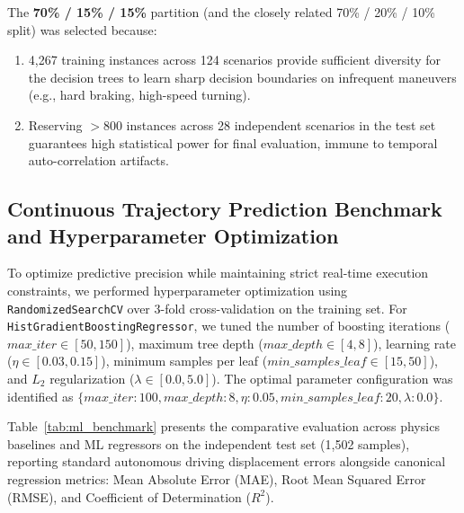 \documentclass[runningheads]{llncs}
\begin{document}
The \textbf{70\% / 15\% / 15\%} partition (and the closely related 70\% / 20\% / 10\% split) was selected because:
\begin{enumerate}
    \item 4,267 training instances across 124 scenarios provide sufficient diversity for the decision trees to learn sharp decision boundaries on infrequent maneuvers (e.g., hard braking, high-speed turning).
    \item Reserving $>800$ instances across 28 independent scenarios in the test set guarantees high statistical power for final evaluation, immune to temporal auto-correlation artifacts.
\end{enumerate}

\subsection{Continuous Trajectory Prediction Benchmark and Hyperparameter Optimization}
To optimize predictive precision while maintaining strict real-time execution constraints, we performed hyperparameter optimization using \texttt{RandomizedSearchCV} over 3-fold cross-validation on the training set. For \texttt{HistGradientBoostingRegressor}, we tuned the number of boosting iterations ($max\_iter \in [50, 150]$), maximum tree depth ($max\_depth \in [4, 8]$), learning rate ($\eta \in [0.03, 0.15]$), minimum samples per leaf ($min\_samples\_leaf \in [15, 50]$), and $L_2$ regularization ($\lambda \in [0.0, 5.0]$). The optimal parameter configuration was identified as $\{max\_iter: 100, max\_depth: 8, \eta: 0.05, min\_samples\_leaf: 20, \lambda: 0.0\}$.

Table~\ref{tab:ml_benchmark} presents the comparative evaluation across physics baselines and ML regressors on the independent test set (1,502 samples), reporting standard autonomous driving displacement errors alongside canonical regression metrics: Mean Absolute Error (MAE), Root Mean Squared Error (RMSE), and Coefficient of Determination ($R^2$).
\end{document}
